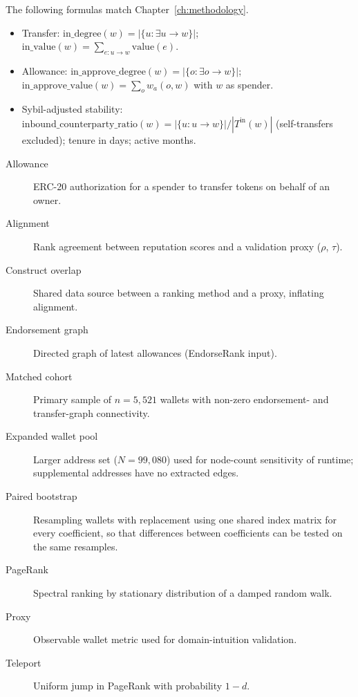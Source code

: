 
The following formulas match Chapter~\ref{ch:methodology}.

\begin{itemize}
\item Transfer: $\mathrm{in\_degree}(w)=|\{u:\exists u\to w\}|$; $\mathrm{in\_value}(w)=\sum_{e:u\to w}\mathrm{value}(e)$.

\item Allowance: $\mathrm{in\_approve\_degree}(w)=|\{o:\exists o\to w\}|$; $\mathrm{in\_approve\_value}(w)=\sum_o w_a(o,w)$ with $w$ as spender.

\item Sybil-adjusted stability: $\mathrm{inbound\_counterparty\_ratio}(w)=|\{u:u\to w\}|/|T^{\mathrm{in}}(w)|$ (self-transfers excluded); tenure in days; active months.
\end{itemize}


\begin{description}
\item[Allowance] ERC-20 authorization for a spender to transfer tokens on behalf of an owner.
\item[Alignment] Rank agreement between reputation scores and a validation proxy ($\rho$, $\tau$).
\item[Construct overlap] Shared data source between a ranking method and a proxy, inflating alignment.
\item[Endorsement graph] Directed graph of latest allowances (EndorseRank input).
\item[Matched cohort] Primary sample of $n=5{,}521$ wallets with non-zero endorsement- and transfer-graph connectivity.
\item[Expanded wallet pool] Larger address set ($N=99{,}080$) used for node-count sensitivity of runtime; supplemental addresses have no extracted edges.
\item[Paired bootstrap] Resampling wallets with replacement using one shared index matrix for every coefficient, so that differences between coefficients can be tested on the same resamples.
\item[PageRank] Spectral ranking by stationary distribution of a damped random walk.
\item[Proxy] Observable wallet metric used for domain-intuition validation.
\item[Teleport] Uniform jump in PageRank with probability $1-d$.
\end{description}






